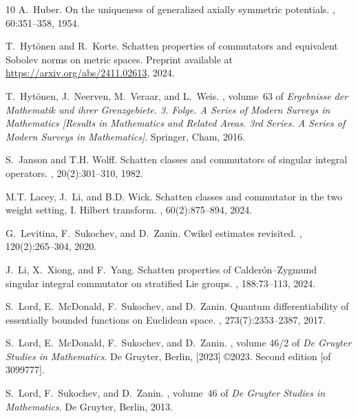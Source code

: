 \documentclass[12pt]{amsart}
\begin{document}
\begin{thebibliography}{10}
A.~Huber.
\newblock On the uniqueness of generalized axially symmetric potentials.
, 60:351--358, 1954.

T.~Hyt\"{o}nen and R.~Korte.
\newblock Schatten properties of commutators and equivalent {\color{blue}Sobolev} norms on
  metric spaces.
\newblock Preprint available at \url{https://arxiv.org/abs/2411.02613}, 2024.

T.~Hyt\"{o}nen, J.~Neerven, M.~Veraar, and L.~Weis.
, volume~63 of {\em Ergebnisse der Mathematik und
  ihrer Grenzgebiete. 3. Folge. A Series of Modern Surveys in Mathematics
  [Results in Mathematics and Related Areas. 3rd Series. A Series of Modern
  Surveys in Mathematics]}.
\newblock Springer, Cham, 2016.

S.~Janson and T.H. Wolff.
\newblock Schatten classes and commutators of singular integral operators.
, 20(2):301--310, 1982.

M.T. Lacey, J.~Li, and B.D. Wick.
\newblock Schatten classes and commutator in the two weight setting, {I}.
  {H}ilbert transform.
, 60(2):875--894, 2024.

G.~Levitina, F.~Sukochev, and D.~Zanin.
\newblock Cwikel estimates revisited.
, 120(2):265--304, 2020.

J.~Li, X.~Xiong, and F.~Yang.
\newblock Schatten properties of {C}alder\'{o}n--{Z}ygmund singular integral
  commutator on stratified {L}ie groups.
, 188:73--113, 2024.

S.~Lord, E.~McDonald, F.~Sukochev, and D.~Zanin.
\newblock Quantum differentiability of essentially bounded functions on
  {E}uclidean space.
, 273(7):2353--2387, 2017.

S.~Lord, E.~McDonald, F.~Sukochev, and D.~Zanin.
, volume 46/2 of
  {\em De Gruyter Studies in Mathematics}.
\newblock De Gruyter, Berlin, [2023] \copyright 2023.
\newblock Second edition [of 3099777].

S.~Lord, F.~Sukochev, and D.~Zanin.
, volume~46 of {\em De
  Gruyter Studies in Mathematics}.
\newblock De Gruyter, Berlin, 2013.


\end{thebibliography}
\end{document}
